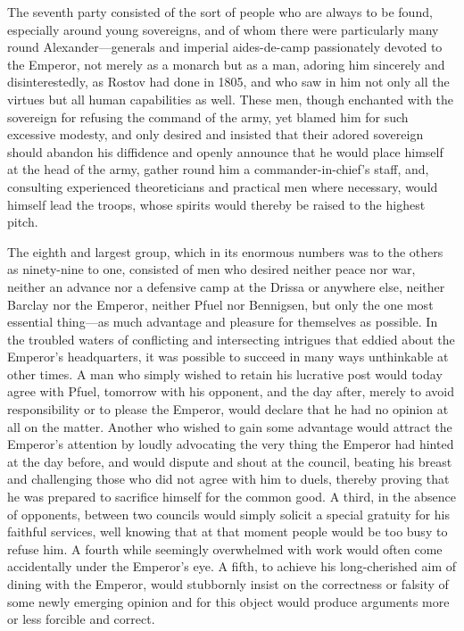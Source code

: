The seventh party consisted of the sort of people who are always
to be found, especially around young sovereigns, and of whom
there were particularly many round Alexander---generals and
imperial aides-de-camp passionately devoted to the Emperor, not
merely as a monarch but as a man, adoring him sincerely and
disinterestedly, as Rostov had done in 1805, and who saw in him
not only all the virtues but all human capabilities as
well. These men, though enchanted with the sovereign for refusing
the command of the army, yet blamed him for such excessive
modesty, and only desired and insisted that their adored
sovereign should abandon his diffidence and openly announce that
he would place himself at the head of the army, gather round him
a commander-in-chief's staff, and, consulting experienced
theoreticians and practical men where necessary, would himself
lead the troops, whose spirits would thereby be raised to the
highest pitch.

The eighth and largest group, which in its enormous numbers was
to the others as ninety-nine to one, consisted of men who desired
neither peace nor war, neither an advance nor a defensive camp at
the Drissa or anywhere else, neither Barclay nor the Emperor,
neither Pfuel nor Bennigsen, but only the one most essential
thing---as much advantage and pleasure for themselves as
possible. In the troubled waters of conflicting and intersecting
intrigues that eddied about the Emperor's headquarters, it was
possible to succeed in many ways unthinkable at other times. A
man who simply wished to retain his lucrative post would today
agree with Pfuel, tomorrow with his opponent, and the day after,
merely to avoid responsibility or to please the Emperor, would
declare that he had no opinion at all on the matter. Another who
wished to gain some advantage would attract the Emperor's
attention by loudly advocating the very thing the Emperor had
hinted at the day before, and would dispute and shout at the
council, beating his breast and challenging those who did not
agree with him to duels, thereby proving that he was prepared to
sacrifice himself for the common good. A third, in the absence of
opponents, between two councils would simply solicit a special
gratuity for his faithful services, well knowing that at that
moment people would be too busy to refuse him. A fourth while
seemingly overwhelmed with work would often come accidentally
under the Emperor's eye. A fifth, to achieve his long-cherished
aim of dining with the Emperor, would stubbornly insist on the
correctness or falsity of some newly emerging opinion and for
this object would produce arguments more or less forcible and
correct.

